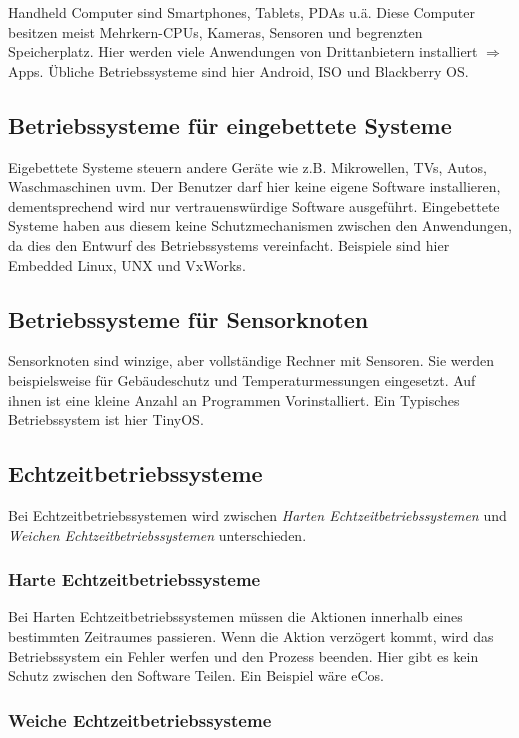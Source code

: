 Handheld Computer sind Smartphones, Tablets, PDAs u.ä. Diese Computer besitzen
meist Mehrkern-CPUs, Kameras, Sensoren und begrenzten Speicherplatz. Hier
werden viele Anwendungen von Drittanbietern installiert $\Rightarrow$ Apps.
Übliche Betriebssysteme sind hier Android, ISO und Blackberry OS.

\subsection{Betriebssysteme für eingebettete Systeme}

Eigebettete Systeme steuern andere Geräte wie z.B. Mikrowellen, TVs, Autos,
Waschmaschinen uvm. Der Benutzer darf hier keine eigene Software installieren,
dementsprechend wird nur vertrauenswürdige Software ausgeführt. Eingebettete
Systeme haben aus diesem keine Schutzmechanismen zwischen den Anwendungen, da
dies den Entwurf des Betriebssystems vereinfacht. Beispiele sind hier Embedded
Linux, UNX und VxWorks.

\subsection{Betriebssysteme für Sensorknoten}

Sensorknoten sind winzige, aber vollständige Rechner mit Sensoren. Sie werden
beispielsweise für Gebäudeschutz und Temperaturmessungen eingesetzt. Auf ihnen
ist eine kleine Anzahl an Programmen Vorinstalliert. Ein Typisches
Betriebssystem ist hier TinyOS.

\subsection{Echtzeitbetriebssysteme}

Bei Echtzeitbetriebssystemen wird zwischen \textit{Harten
    Echtzeitbetriebssystemen} und \textit{Weichen Echtzeitbetriebssystemen}
unterschieden.

\subsubsection*{Harte Echtzeitbetriebssysteme}

Bei Harten Echtzeitbetriebssystemen müssen die Aktionen innerhalb eines
bestimmten Zeitraumes passieren. Wenn die Aktion verzögert kommt, wird das
Betriebssystem ein Fehler werfen und den Prozess beenden. Hier gibt es kein
Schutz zwischen den Software Teilen. Ein Beispiel wäre eCos.

\subsubsection*{Weiche Echtzeitbetriebssysteme}

